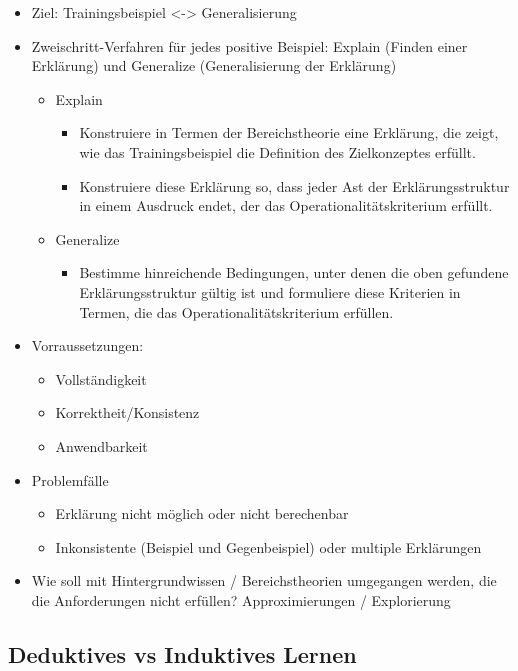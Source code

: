 \documentclass[paper=a4, fontsize=11pt]{scrartcl} %
\numberwithin{equation}{section} %
\numberwithin{figure}{section} %
\numberwithin{table}{section} %
\begin{document}
\begin{itemize}
\item Ziel: Trainingsbeispiel <-> Generalisierung
\item Zweischritt-Verfahren für jedes positive Beispiel: Explain (Finden einer Erklärung) und Generalize (Generalisierung der Erklärung)
\begin{itemize}
\item Explain
\begin{itemize}
\item Konstruiere in Termen der Bereichstheorie eine Erklärung, die zeigt, wie das Trainingsbeispiel die Definition des Zielkonzeptes erfüllt.
\item Konstruiere diese Erklärung so, dass jeder Ast der Erklärungsstruktur in einem Ausdruck endet, der das Operationalitätskriterium erfüllt.
\end{itemize}
\item Generalize
\begin{itemize}
\item Bestimme hinreichende Bedingungen, unter denen die oben gefundene Erklärungsstruktur gültig ist und formuliere diese Kriterien in Termen, die das Operationalitätskriterium erfüllen.
\end{itemize}
\end{itemize}
\item Vorraussetzungen:
\begin{itemize}
\item Vollständigkeit
\item Korrektheit/Konsistenz
\item Anwendbarkeit
\end{itemize}
\item Problemfälle
\begin{itemize}
\item Erklärung nicht möglich oder nicht berechenbar
\item Inkonsistente (Beispiel und Gegenbeispiel) oder multiple Erklärungen
\end{itemize}
\item Wie soll mit Hintergrundwissen / Bereichstheorien umgegangen werden, die die Anforderungen nicht erfüllen? Approximierungen / Explorierung
\end{itemize}

\subsection{Deduktives vs Induktives Lernen}
\end{document}
